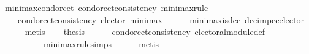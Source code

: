 \begin{isabellebody}
{}
\isamarkuptrue%
%
\endisatagdocument
{\isafolddocument}%
%
\isadelimdocument
%
\endisadelimdocument
{}\isamarkupfalse%
\ minimax{\isacharunderscore}{\kern0pt}condorcet{\isacharcolon}{\kern0pt}\ {\isachardoublequoteopen}condorcet{\isacharunderscore}{\kern0pt}consistency\ minimax{\isacharunderscore}{\kern0pt}rule{\isachardoublequoteclose}\isanewline
%
\isadelimproof
%
\endisadelimproof
%
\isatagproof
{}\isamarkupfalse%
\ {\isacharminus}{\kern0pt}\isanewline
\ \ \isamarkupfalse%
\isanewline
\ \ \ \ {\isachardoublequoteopen}condorcet{\isacharunderscore}{\kern0pt}consistency\ {\isacharparenleft}{\kern0pt}elector\ minimax{\isacharparenright}{\kern0pt}{\isachardoublequoteclose}\isanewline
\ \ \ \ \isamarkupfalse%
\ minimax{\isacharunderscore}{\kern0pt}is{\isacharunderscore}{\kern0pt}dcc\ dcc{\isacharunderscore}{\kern0pt}imp{\isacharunderscore}{\kern0pt}cc{\isacharunderscore}{\kern0pt}elector\isanewline
\ \ \ \ \isamarkupfalse%
\ metis\isanewline
\ \ \isamarkupfalse%
\ {\isacharquery}{\kern0pt}thesis\isanewline
\ \ \ \ \isamarkupfalse%
\ condorcet{\isacharunderscore}{\kern0pt}consistency{}\ electoral{\isacharunderscore}{\kern0pt}module{\isacharunderscore}{\kern0pt}def\isanewline
\ \ \ \ \ \ \ \ \ \ minimax{\isacharunderscore}{\kern0pt}rule{\isachardot}{\kern0pt}simps\isanewline
\ \ \ \ \isamarkupfalse%
\ metis\isanewline
{}\isamarkupfalse%
%
\endisatagproof
{\isafoldproof}%
%
\isadelimproof
\isanewline
%
\endisadelimproof
%
\isadelimtheory
\isanewline
%
\endisadelimtheory
%
\isatagtheory
{}\isamarkupfalse%
%
\endisatagtheory
{\isafoldtheory}%
%
\isadelimtheory
%
\endisadelimtheory
%
\end{isabellebody}%
\endinput
